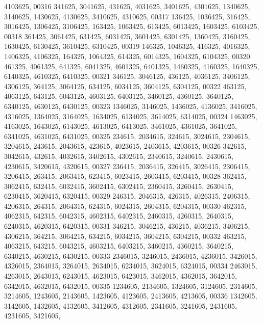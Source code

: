 \begin{DoxyCode}
      4103625,
00316        341625, 3041625,  431625, 4031625, 3401625, 4301625, 1340625, 3140625, 1430625, 4130625, 3410625, 
      4310625,
00317        136425, 1036425,  316425, 3016425, 1306425, 3106425,  163425, 1063425,  613425, 6013425, 1603425, 
      6103425,
00318        361425, 3061425,  631425, 6031425, 3601425, 6301425, 1360425, 3160425, 1630425, 6130425, 3610425, 
      6310425,
00319        146325, 1046325,  416325, 4016325, 1406325, 4106325,  164325, 1064325,  614325, 6014325, 1604325, 
      6104325,
00320        461325, 4061325,  641325, 6041325, 4601325, 6401325, 1460325, 4160325, 1640325, 6140325, 4610325, 
      6410325,
00321        346125, 3046125,  436125, 4036125, 3406125, 4306125,  364125, 3064125,  634125, 6034125, 3604125, 
      6304125,
00322        463125, 4063125,  643125, 6043125, 4603125, 6403125, 3460125, 4360125, 3640125, 6340125, 4630125, 
      6430125,
00323       1346025, 3146025, 1436025, 4136025, 3416025, 4316025, 1364025, 3164025, 1634025, 6134025, 3614025, 
      6314025,
00324       1463025, 4163025, 1643025, 6143025, 4613025, 6413025, 3461025, 4361025, 3641025, 6341025, 4631025, 
      6431025,
00325        234615, 2034615,  324615, 3024615, 2304615, 3204615,  243615, 2043615,  423615, 4023615, 2403615, 
      4203615,
00326        342615, 3042615,  432615, 4032615, 3402615, 4302615, 2340615, 3240615, 2430615, 4230615, 3420615, 
      4320615,
00327        236415, 2036415,  326415, 3026415, 2306415, 3206415,  263415, 2063415,  623415, 6023415, 2603415, 
      6203415,
00328        362415, 3062415,  632415, 6032415, 3602415, 6302415, 2360415, 3260415, 2630415, 6230415, 3620415, 
      6320415,
00329        246315, 2046315,  426315, 4026315, 2406315, 4206315,  264315, 2064315,  624315, 6024315, 2604315, 
      6204315,
00330        462315, 4062315,  642315, 6042315, 4602315, 6402315, 2460315, 4260315, 2640315, 6240315, 4620315, 
      6420315,
00331        346215, 3046215,  436215, 4036215, 3406215, 4306215,  364215, 3064215,  634215, 6034215, 3604215, 
      6304215,
00332        463215, 4063215,  643215, 6043215, 4603215, 6403215, 3460215, 4360215, 3640215, 6340215, 4630215, 
      6430215,
00333       2346015, 3246015, 2436015, 4236015, 3426015, 4326015, 2364015, 3264015, 2634015, 6234015, 3624015, 
      6324015,
00334       2463015, 4263015, 2643015, 6243015, 4623015, 6423015, 3462015, 4362015, 3642015, 6342015, 4632015, 
      6432015,
00335       1234605, 2134605, 1324605, 3124605, 2314605, 3214605, 1243605, 2143605, 1423605, 4123605, 2413605, 
      4213605,
00336       1342605, 3142605, 1432605, 4132605, 3412605, 4312605, 2341605, 3241605, 2431605, 4231605, 3421605, 

\end{DoxyCode}
